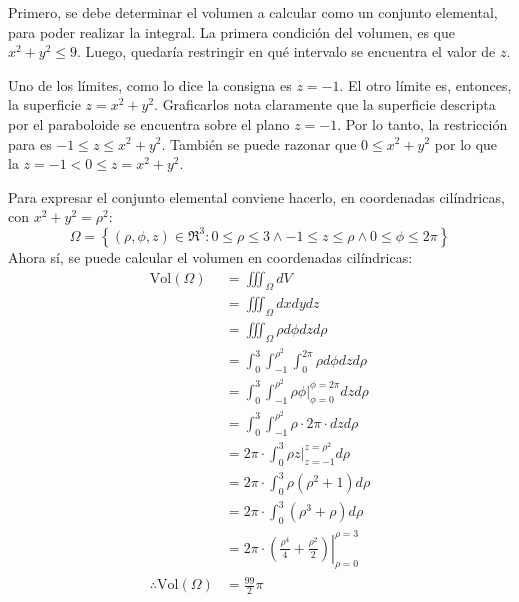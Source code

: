 \begin{solution}
    Primero, se debe determinar el volumen a calcular como un conjunto elemental, para poder
    realizar la integral. La primera condición del volumen, es que $x^2+y^2 \leq 9$. Luego, quedaría restringir
    en qué intervalo se encuentra el valor de $z$.
    
    Uno de los límites, como lo dice la consigna es $z=-1$.
    El otro límite es, entonces, la superficie $z=x^2+y^2$. Graficarlos nota claramente que la superficie
    descripta por el paraboloide se encuentra sobre el plano $z=-1$. Por lo tanto, la restricción para es
    $-1\leq z \leq x^2+y^2$. También se puede razonar que $0\leq x^2+y^2$ por lo que la $z=-1 < 0 \leq z=x^2+y^2$.

    Para expresar el conjunto elemental conviene hacerlo, en coordenadas cilíndricas, con $x^2+y^2=\rho^2$:
    \begin{equation*}
        \Omega = \left\{(\rho,\phi,z) \in \Re^3 : 0\leq\rho\leq 3 \land -1\leq z \leq \rho \land 0\leq\phi\leq 2\pi \right\}
    \end{equation*}
    Ahora sí, se puede calcular el volumen en coordenadas cilíndricas:
    \begin{align*}
        \text{Vol}(\Omega)&=\iiint_\Omega dV\\
        &=\iiint_\Omega dxdydz\\
        &=\iiint_\Omega \rho d\phi dz d\rho\\
        &= \int_0^3 \int_{-1}^{\rho^2} \int_0^{2\pi} \rho d\phi dz d\rho\\
        &= \int_0^3 \int_{-1}^{\rho^2} \rho \left.\phi\right|_{\phi=0}^{\phi=2\pi} dz d\rho\\
        &= \int_0^3 \int_{-1}^{\rho^2} \rho \cdot 2\pi \cdot dz d\rho\\
        &= 2\pi \cdot \int_0^3 \rho \left.z\right|_{z=-1}^{z=\rho^2} d\rho\\
        &= 2\pi \cdot \int_0^3 \rho \left(\rho^2+1\right) d\rho\\
        &= 2\pi \cdot \int_0^3 \left(\rho^3+\rho\right) d\rho\\
        &= 2\pi \cdot \left.\left(\frac{\rho^4}{4}+\frac{\rho^2}{2}\right)\right|_{\rho=0}^{\rho=3}\\
        \therefore\text{Vol}(\Omega)&= \frac{99}{2}\pi
    \end{align*}

\end{solution}

